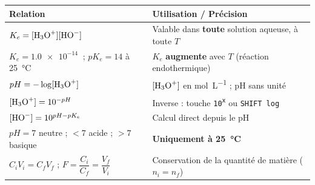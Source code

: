 \documentclass[11pt]{article}
\begin{document}
\begin{propriete}
\begin{center}
\begin{tabularx}{\linewidth}{|l|X|}\hline
\rowcolor{popblueL} \textbf{Relation} & \textbf{Utilisation / Précision} \\\hline
$K_e=[\ce{H3O+}][\ce{HO-}]$ & Valable dans \textbf{toute} solution aqueuse, à toute $T$ \\\hline
$K_e=\SI{1,0e-14}{}$ ; $pK_e=14$ à \SI{25}{\celsius} & $K_e$ \textbf{augmente} avec $T$ (réaction endothermique) \\\hline
$pH=-\log[\ce{H3O+}]$ & $[\ce{H3O+}]$ en \si{mol.L^{-1}} ; pH sans unité \\\hline
$[\ce{H3O+}]=10^{-pH}$ & Inverse : touche \texttt{10\textsuperscript{x}} ou \texttt{SHIFT log} \\\hline
$[\ce{HO-}]=10^{pH-pK_e}$ & Calcul direct depuis le pH \\\hline
$pH=7$ neutre ; $<7$ acide ; $>7$ basique & \textbf{Uniquement à \SI{25}{\celsius}} \\\hline
$C_iV_i=C_fV_f$ ; $F=\dfrac{C_i}{C_f}=\dfrac{V_f}{V_i}$ & Conservation de la quantité de matière ($n_i=n_f$) \\\hline
\end{tabularx}
\end{center}
\end{propriete}
\end{document}
